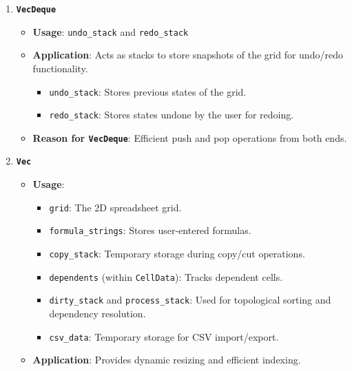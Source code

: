 \documentclass{article}
\begin{document}
\begin{enumerate}
   

    \item \textbf{\texttt{VecDeque}}
    \begin{itemize}
        \item \textbf{Usage}: \texttt{undo\_stack} and \texttt{redo\_stack}
        \item \textbf{Application}: Acts as stacks to store snapshots of the grid for undo/redo functionality.
        \begin{itemize}
            \item \texttt{undo\_stack}: Stores previous states of the grid.
            \item \texttt{redo\_stack}: Stores states undone by the user for redoing.
        \end{itemize}
        \item \textbf{Reason for \texttt{VecDeque}}: Efficient push and pop operations from both ends.
    \end{itemize}

    \item \textbf{\texttt{Vec}}
    \begin{itemize}
        \item \textbf{Usage}:
        \begin{itemize}
            \item \texttt{grid}: The 2D spreadsheet grid.
            \item \texttt{formula\_strings}: Stores user-entered formulas.
            \item \texttt{copy\_stack}: Temporary storage during copy/cut operations.
            \item \texttt{dependents} (within \texttt{CellData}): Tracks dependent cells.
            \item \texttt{dirty\_stack} and \texttt{process\_stack}: Used for topological sorting and dependency resolution.
            \item \texttt{csv\_data}: Temporary storage for CSV import/export.
        \end{itemize}
        \item \textbf{Application}: Provides dynamic resizing and efficient indexing.
    \end{itemize}



\end{enumerate}
\end{document}
